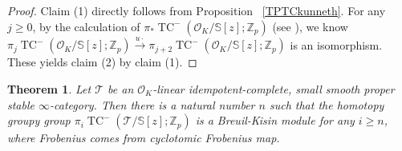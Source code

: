 \documentclass[11pt]{amsart}
\newcommand{\Z}{\mathbb{Z}}
\newcommand{\sO}{\mathcal{O}}
\newcommand{\sT}{\mathcal{T}}
\newcommand{\bS}{\mathbb{S}}
\newcommand{\THH}{\operatorname{THH}}
\newcommand{\TCn}{\operatorname{TC}^{-}}
\newtheorem{thm}[lemma]{Theorem}
\theoremstyle{definition}
\theoremstyle{remark}
\numberwithin{equation}{section}
\begin{document}
\begin{proof}
Claim (1) directly follows from Proposition ~\ref{TPTCkunneth}. For any $j \geq 0$, by the calculation of $\pi_* \TCn(\sO_K/\bS[z];\Z_p)$ (see \cite[Proposition 11.10]{BMS2}), we know $\pi_j\TCn(\sO_K/\bS[z];\Z_p)\overset{u\cdot}{\to} \pi_{j+2}\TCn(\sO_K/\bS[z];\Z_p)$ is an isomorphism. These yields claim (2) by claim (1).
\end{proof}
\begin{thm}\label{BKtheorem}
Let $\sT$ be an $\sO_K$-linear idempotent-complete, small smooth proper stable $\infty$-category. Then there is a natural number $n$ such that the homotopy groupy group $\pi_i \TCn(\sT/\bS[z];\Z_p)$ is a Breuil-Kisin module for any $i\geq n$, where Frobenius comes from cyclotomic Frobenius map.%
\end{thm}
\end{document}
